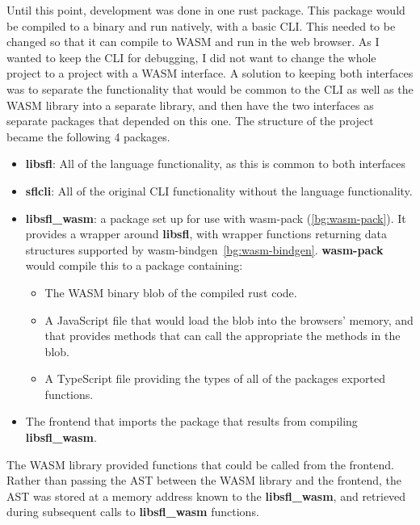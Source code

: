 Until this point, development was done in one rust package. This package would be compiled to a binary and run natively, with a basic \ac{CLI}. This needed to be changed so that it can compile to \ac{WASM} and run in the web browser. As I wanted to keep the \ac{CLI} for debugging, I did not want to change the whole project to a project with a \ac{WASM} interface. A solution to keeping both interfaces was to separate the functionality that would be common to the \ac{CLI} as well as the \ac{WASM} library into a separate library, and then have the two interfaces as separate packages that depended on this one. The structure of the project became the following 4 packages. 

\begin{itemize}
    \item \textbf{libsfl}: All of the language functionality, as this is common to both interfaces
    \item \textbf{sflcli}: All of the original CLI functionality without the language functionality.  
    \item \textbf{libsfl\_wasm}: a package set up for use with wasm-pack (\ref{bg:wasm-pack}). It provides a wrapper around \textbf{libsfl}, with wrapper functions returning data structures supported by wasm-bindgen~\ref{bg:wasm-bindgen}. \textbf{wasm-pack} would compile this to a package containing:
    \begin{itemize}
        \item The \ac{WASM} binary blob of the compiled rust code.
        \item A JavaScript file that would load the blob into the browsers' memory, and that provides methods that can call the appropriate the methods in the blob.
        \item A TypeScript file providing the types of all of the packages exported functions. 
    \end{itemize}
    \item The frontend that imports the package that results from compiling \textbf{libsfl\_wasm}.
\end{itemize}

The \ac{WASM} library provided functions that could be called from the frontend. Rather than passing the \ac{AST} between the \ac{WASM} library and the frontend, the \ac{AST} was stored at a memory address known to the \textbf{libsfl\_wasm}, and retrieved during subsequent calls to \textbf{libsfl\_wasm} functions. 

